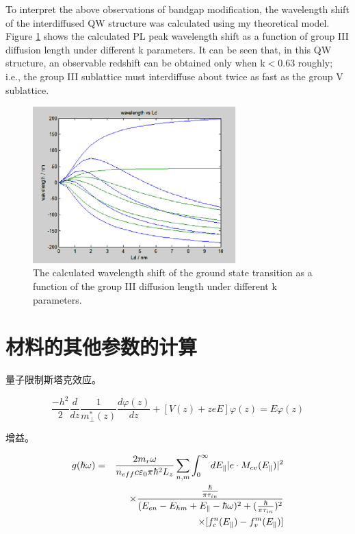 \documentclass{ZJUthesis}
\begin{document}
To interpret the above observations of bandgap modification, the wavelength shift of the interdiffused QW structure was calculated using my theoretical model. Figure \ref{my_redshift} shows the calculated PL peak wavelength shift as a function of group III diffusion length under different k parameters. It can be seen that, in this QW structure, an observable redshift can be obtained only when k$<$0.63 roughly; i.e., the group III sublattice must interdiffuse about twice as fast as the group V sublattice.

\begin{figure}[!t]
    \centering
    \includegraphics[width=0.7\textwidth]{./Pictures/red.eps}
    \caption{The calculated wavelength shift of the ground state transition as a function of the group III diffusion length under different k parameters.}
    \label{my_redshift}
\end{figure}

\section{材料的其他参数的计算}

量子限制斯塔克效应。

\begin{equation}
    \label{QCSE}
    \frac{-h^2}{2}
    \frac{d}{dz}
    \frac{1}{m_\perp^*(z)}
    \frac{d\varphi(z)}{dz}
    +[V(z)+zeE]\varphi(z)
        = E\varphi(z)
\end{equation}


增益。

\begin{eqnarray}
    g(\hbar\omega) &=& \frac{2 m_r \omega}{n_{eff} c \varepsilon_0 \pi \hbar^2 L_z}
        \sum_{n,m} \int_0^\infty dE_\parallel |e\cdot M_{cv}(E_\parallel)|^2 \notag\\
    && \times \frac{\frac{\hbar}{\pi \tau_{in}}}
        {(E_{en}-E_{hm}+E_\parallel-\hbar\omega)^2+(\frac{\hbar}{\pi \tau_{in}})^2} \notag\\
    && \times [f_c^n(E_\parallel)-f_v^m(E_\parallel)]
\end{eqnarray}
\end{document}
